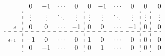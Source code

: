 \documentclass{article}
\begin{document}
\[\begin{array}{rl@{}:cccc:cccc:c:@{}r r@{}c@{}l}
                           &                                                                                            & 0              & -1     & \cdots & 0              & 0                 & -1           & \cdots & 0                & 0                  &                                                                                            &                                                                                            & 0                                                                                                   \\
                           &                                                                                            & \vdots         & \vdots & \ddots & \vdots         & \vdots            & \vdots       & \ddots & \vdots           & \vdots             &                                                                                            &                                                                                            & \vdots                                                                                              \\
        \scriptscriptstyle d     &                                                                                            & 0              & 0      & \cdots & -1             & 0                 & 0            & \cdots & -1               & 0                  &                                                                                            &                                                                                            & 0                                                                                                   \\
        \hdashline      \rule{0pt}{1.5em}
        \scriptscriptstyle{d+1}  &                                                                                            & -1             & 0      & \cdots & 0              & 1                 & 0            & \cdots & 0                & 0                  &                                                                                            &                                                                                            & 0                                                                                                   \\
                           &                                                                                            & 0              & -1     & \cdots & 0              & 0                 & 1            & \cdots & 0                & 0                  &                                                                                            &                                                                                            & 0                                                                                                   \\

\end{array}\]
\end{document}
